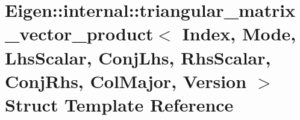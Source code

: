 \hypertarget{struct_eigen_1_1internal_1_1triangular__matrix__vector__product_3_01_index_00_01_mode_00_01_lhs_ba3c1ba3cb379196807b17d99fce4e08}{}\section{Eigen\+:\+:internal\+:\+:triangular\+\_\+matrix\+\_\+vector\+\_\+product$<$ Index, Mode, Lhs\+Scalar, Conj\+Lhs, Rhs\+Scalar, Conj\+Rhs, Col\+Major, Version $>$ Struct Template Reference}
\label{struct_eigen_1_1internal_1_1triangular__matrix__vector__product_3_01_index_00_01_mode_00_01_lhs_ba3c1ba3cb379196807b17d99fce4e08}
